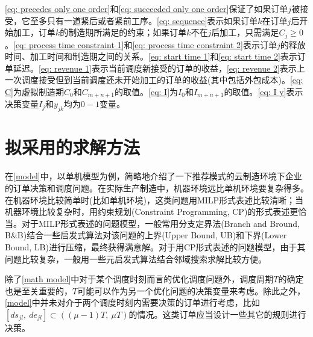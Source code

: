 \documentclass[UTF8]{ctexart}
\begin{document}
\cref{eq: precedes only one order}和\cref{eq: succeeded only one order}保证了如果订单$j$被接受，它至多只有一道紧后或者紧前工序。\cref{eq: sequence}表示如果订单$k$在订单$j$后开始加工，订单$k$的制造期所满足的约束；如果订单$k$不在$j$后加工，只需满足$C_j \geqslant 0$。\cref{eq: process time constraint 1}和\cref{eq: process time constraint 2}表示订单$j$的释放时间、加工时间和制造期之间的关系。\cref{eq: start time 1}和\cref{eq: start time 2}表示订单延迟。\cref{eq: revenue 1}表示当前调度新接受的订单的收益，\cref{eq: revenue 2}表示上一次调度接受但到当前调度还未开始加工的订单的收益(其中包括外包成本)。\cref{eq: C}为虚拟制造期$C_0$和$C_{m + n + 1}$的取值。\cref{eq: I}为$I_0$和$I_{m + n + 1}$的取值。\cref{eq: I y}表示决策变量$I_j$和$y_{jk}$均为$0-1$变量。


\section{拟采用的求解方法}
\label{solution}
在\cref{model}中，以单机模型为例，简略地介绍了一下推荐模式的云制造环境下企业的订单决策和调度问题。在实际生产制造中，机器环境远比单机环境要复杂得多。在机器环境比较简单时(比如单机环境)，这类问题用MILP形式表述比较清晰；当机器环境比较复杂时，用约束规划(Constraint Programming, CP)的形式表述更恰当。对于MILP形式表述的问题模型，一般常用分支定界法(Branch and Bround, B\&B)结合一些启发式算法对该问题的上界(Upper Bound, UB)和下界(Lower Bound, LB)进行压缩，最终获得满意解。对于用CP形式表述的问题模型，由于其问题比较复杂，一般用一些元启发式算法结合邻域搜索求解比较方便。

除了\cref{math model}中对于某个调度时刻而言的优化调度问题外，调度周期$T$的确定也是至关重要的，$T$可能可以作为另一个优化问题的决策变量来考虑。除此之外，\cref{model}中并未对介于两个调度时刻内需要决策的订单进行考虑，比如$[ds_{jl},\ de_{jl}] \subset ((\mu - 1)T,\ \mu T)$的情况。这类订单应当设计一些其它的规则进行决策。


 
 
\end{document}

